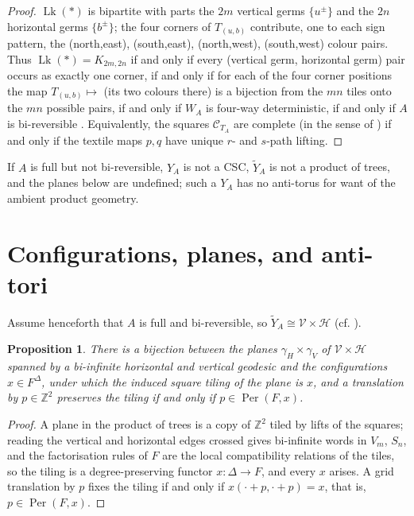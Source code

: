 \documentclass[11pt,reqno]{amsart}
\theoremstyle{plain}
\newtheorem{proposition}[theorem]{Proposition}
\theoremstyle{definition}
\newcommand{\ZZ}{\mathbb{Z}}
\newcommand{\Per}{\operatorname{Per}}
\newcommand{\Lk}{\operatorname{Lk}}
\newcommand{\Vm}{V_m}
\newcommand{\Sn}{S_n}
\begin{document}
\begin{proof}
$\Lk(*)$ is bipartite with parts the $2m$ vertical germs $\{u^\pm\}$ and the $2n$
horizontal germs $\{b^\pm\}$; the four corners of $T_{(u,b)}$ contribute, one to
each sign pattern, the (north,east), (south,east), (north,west), (south,west)
colour pairs. Thus $\Lk(*)=K_{2m,2n}$ if and only if every (vertical germ,
horizontal germ) pair occurs as exactly one corner, if and only if for each of the
four corner positions the map $T_{(u,b)}\mapsto$ (its two colours there) is a
bijection from the $mn$ tiles onto the $mn$ possible pairs, if and only if $W_A$ is
four-way deterministic, if and only if $A$ is bi-reversible \cite{GM}. Equivalently,
the squares $\mathcal C_{T_A}$ are complete (in the sense of \cite{HRSW}) if and only
if the textile maps $p,q$ have unique $r$- and $s$-path lifting.
\end{proof}

If $A$ is full but not bi-reversible, $Y_A$ is not a CSC, $\widetilde Y_A$ is not a
product of trees, and the planes below are undefined; such a $Y_A$ has no
anti-torus for want of the ambient product geometry.

\section{Configurations, planes, and anti-tori}

Assume henceforth that $A$ is full and bi-reversible, so $\widetilde Y_A\cong
\mathcal V\times\mathcal H$ (cf. \cite{GM, W}).

\begin{proposition}\label{prop:planes}
There is a bijection between the planes $\gamma_H\times\gamma_V$ of $\mathcal
V\times\mathcal H$ spanned by a bi-infinite horizontal and vertical geodesic and the
configurations $x\in F^\Delta$, under which the induced square tiling of the plane
is $x$, and a translation by $p\in\ZZ^2$ preserves the tiling if and only if
$p\in\Per(F,x)$.
\end{proposition}

\begin{proof}
A plane in the product of trees is a copy of $\ZZ^2$ tiled by lifts of the squares;
reading the vertical and horizontal edges crossed gives bi-infinite words in $\Vm$,
$\Sn$, and the factorisation rules of $F$ are the local compatibility relations of
the tiles, so the tiling is a degree-preserving functor $x\colon\Delta\to F$, and
every $x$ arises. A grid translation by $p$ fixes the tiling if and only if
$x(\cdot+p,\cdot+p)=x$, that is, $p\in\Per(F,x)$.
\end{proof}
\end{document}
